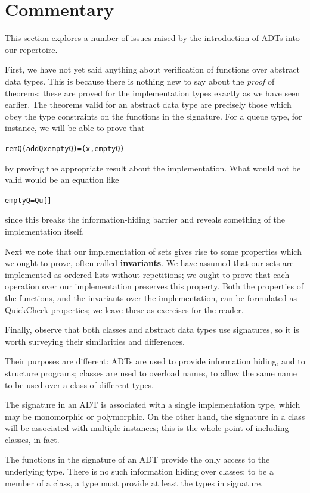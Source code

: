 \section{Commentary}
\label{adtCommentary}

This section explores a number of issues raised by the introduction of ADTs
into our repertoire.

First, we
have not yet said anything about verification of functions over abstract
data types.
This is because there is nothing new to say about the {\em proof\/} of
theorems: these are proved for the implementation types exactly as we have
seen earlier. The theorems valid for an abstract data type
are precisely those which
obey the type constraints on the functions in the signature. For a queue type,
for instance, we will be able to prove that
\begin{alltt}
remQ (addQ x emptyQ) = (x , emptyQ)
\end{alltt}
by proving the appropriate result about the implementation. What would not be
valid would be an equation like 
\begin{alltt}
emptyQ = Qu []
\end{alltt}
since this breaks the information-hiding barrier and reveals something of the
implementation itself.

Next we note that our
implementation of sets gives rise to some properties which we
ought to prove, often called \textbf{invariants}.
We have assumed that our sets
are implemented as ordered lists without repetitions; we ought to prove that
each operation over our implementation preserves this property.
Both the properties of the functions, and the invariants over the implementation, can be formulated as QuickCheck properties; we leave these as exercises for the reader.

Finally, observe that both classes and
abstract data types use signatures, so it is worth surveying
their similarities and differences.
\begin{titemize}
\item Their purposes are different: ADTs are used to provide information
hiding, and to structure programs; classes are used to overload names, to
allow the same name to be used over a class of different types.
\item The signature in an ADT is associated with a single implementation
type, which may
be monomorphic or polymorphic. On the other hand, the signature in a class
will be associated with multiple instances; this is the whole point of
including classes, in fact.
\item The functions in the signature of an ADT provide the only access
to the underlying type. There is no such information hiding over classes: to
be a member of a class, a type must provide at least the types in
signature.
\end{titemize}

